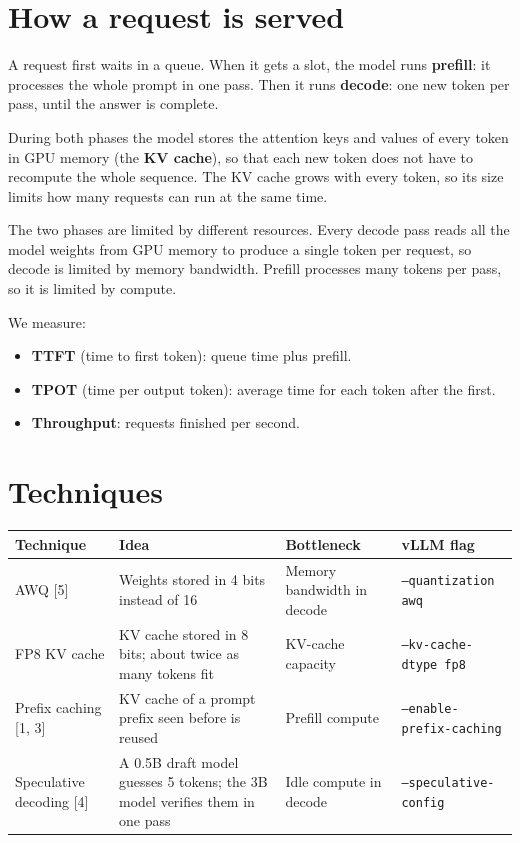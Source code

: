 \documentclass[11pt,a4paper]{article}
\begin{document}
\section{How a request is served}

A request first waits in a queue. When it gets a slot, the model runs \textbf{prefill}: it processes the whole prompt in one pass. Then it runs \textbf{decode}: one new token per pass, until the answer is complete.

During both phases the model stores the attention keys and values of every token in GPU memory (the \textbf{KV cache}), so that each new token does not have to recompute the whole sequence. The KV cache grows with every token, so its size limits how many requests can run at the same time.

The two phases are limited by different resources. Every decode pass reads all the model weights from GPU memory to produce a single token per request, so decode is limited by memory bandwidth. Prefill processes many tokens per pass, so it is limited by compute.

We measure:
\begin{itemize}
\item \textbf{TTFT} (time to first token): queue time plus prefill.
\item \textbf{TPOT} (time per output token): average time for each token after the first.
\item \textbf{Throughput}: requests finished per second.
\end{itemize}

\section{Techniques}

\begin{tabularx}{\linewidth}{@{}P{2.4cm}XP{2.7cm}P{4.1cm}@{}}
\toprule
Technique & Idea & Bottleneck & vLLM flag\\
\midrule
AWQ [5] & Weights stored in 4 bits instead of 16 & Memory bandwidth in decode & \texttt{--quantization awq}\\
FP8 KV cache & KV cache stored in 8 bits; about twice as many tokens fit & KV-cache capacity & \texttt{--kv-cache-dtype fp8}\\
Prefix caching [1, 3] & KV cache of a prompt prefix seen before is reused & Prefill compute & \texttt{--enable-prefix-caching}\\
Speculative decoding [4] & A 0.5B draft model guesses 5 tokens; the 3B model verifies them in one pass & Idle compute in decode & \texttt{--speculative-config}\\
\bottomrule
\end{tabularx}
\end{document}
